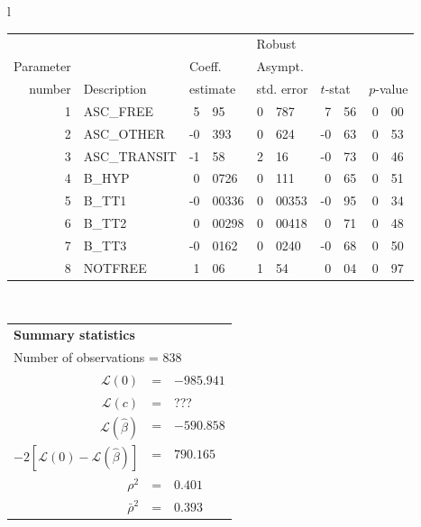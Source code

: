   \begin{tabular}{l}
\begin{tabular}{rlr@{.}lr@{.}lr@{.}lr@{.}l}
         &                       &   \multicolumn{2}{l}{}    & \multicolumn{2}{l}{Robust}  &     \multicolumn{4}{l}{}   \\
Parameter &                       &   \multicolumn{2}{l}{Coeff.}      & \multicolumn{2}{l}{Asympt.}  &     \multicolumn{4}{l}{}   \\
number &  Description                     &   \multicolumn{2}{l}{estimate}      & \multicolumn{2}{l}{std. error}  &   \multicolumn{2}{l}{$t$-stat}  &   \multicolumn{2}{l}{$p$-value}   \\

\hline

1 & ASC\_FREE & 5&95 & 0&787 & 7&56 & 0&00 \\
2 & ASC\_OTHER & -0&393 & 0&624 & -0&63 & 0&53 \\
3 & ASC\_TRANSIT & -1&58 & 2&16 & -0&73 & 0&46 \\
4 & B\_HYP & 0&0726 & 0&111 & 0&65 & 0&51 \\
5 & B\_TT1 & -0&00336 & 0&00353 & -0&95 & 0&34 \\
6 & B\_TT2 & 0&00298 & 0&00418 & 0&71 & 0&48 \\
7 & B\_TT3 & -0&0162 & 0&0240 & -0&68 & 0&50 \\
\hline
8 & NOTFREE & 1&06 & 1&54 & 0&04\footnotemark[1] & 0&97 \\
\hline

\end{tabular}
\\
\begin{tabular}{rcl}
\multicolumn{3}{l}{\bf Summary statistics}\\
\multicolumn{3}{l}{ Number of observations = $838$} \\
 $\mathcal{L}(0)$ &=&  $-985.941$ \\
 $\mathcal{L}(c)$ &=& ???\\
 $\mathcal{L}(\hat{\beta})$ &=& $-590.858 $  \\
 $-2[\mathcal{L}(0) -\mathcal{L}(\hat{\beta})]$ &=& $790.165$ \\
    $\rho^2$ &=&   $0.401$ \\
    $\bar{\rho}^2$ &=&    $0.393$ \\
\end{tabular}
\end{tabular}

